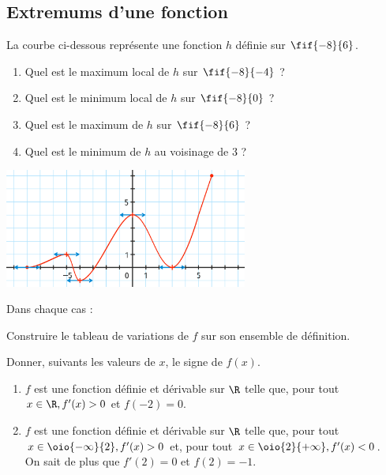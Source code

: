 \documentclass[a4paper,11pt,exos]{nsi} %
\begin{document}
\subsection*{Extremums d'une fonction}
\exo{}
La courbe ci-dessous représente une fonction $h$ définie sur $\fif{-8}{6}$.\\
\begin{minipage}{9cm}
	\begin{enumerate}
		\item 	Quel est le maximum local de $h$ sur $\fif{-8}{-4}$ ?
		\item 	Quel est le minimum local de $h$ sur $\fif{-8}{0}$ ?
		\item	Quel est le maximum de $h$ sur $\fif{-8}{6}$ ?
		\item	Quel est le minimum de $h$ au voisinage de 3 ?	
	\end{enumerate}
\end{minipage}
\begin{minipage}{8cm}
	\begin{flushright}
		\includegraphics[width=8cm]{courbe5}
	\end{flushright}
\end{minipage}


\exo{}
Dans chaque cas :
\begin{enumalph}
	\item 	Construire le tableau de variations de $f$ sur son ensemble de définition.
	\item 	Donner, suivants les valeurs de $x$, le signe de $f(x)$.	
\end{enumalph}
\begin{multicols}{2}
	\begin{enumerate}
		\item 	$f$ est une fonction définie et dérivable sur $\R$ telle que, pour tout $x\in \R, f'(x)>0$ et $f(-2)=0$.
		\item 	$f$ est une fonction définie et dérivable sur $\R$ telle que, pour tout $x\in \oio{-\infty}{2}, f'(x)>0$ et, pour tout $x\in\oio{2}{+\infty}, f'(x)<0$.\\
		On sait de plus que $f'(2)=0$ et $f(2)=-1$.
	\end{enumerate}
\end{multicols}
\end{document}
